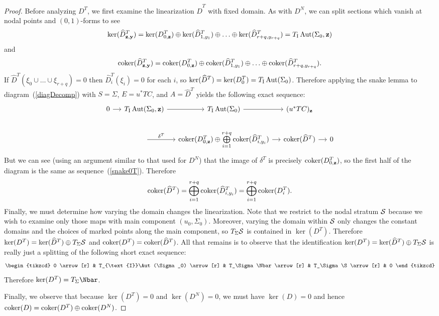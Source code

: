 \begin{proposition}
\begin{proof}
Before analyzing $D^T$, we first examine the linearization $\hat{D}^T$ with fixed domain. As with $D^N$, we can split sections which vanish at nodal points and $(0,1)$-forms to see
\[
\ker(\hat{D}_{\bf{z},\bf{y}}^T) = \ker(D_{0,\bf{z}}^T) \oplus \ker(\hat{D}_{1,y_1}^T) \oplus \ldots \oplus \ker(\hat{D}_{r+q,y_{r+q}}^T) = T_{\text{I}}\Aut(\Sigma_0,\bf{z})
\]
and
\[
\coker(\hat{D}_{\bf{z},\bf{y}}^T) = \coker(D_{0,\bf{z}}^T) \oplus \coker(\hat{D}_{1,y_1}^T) \oplus \ldots \oplus \coker(\hat{D}_{r+q,y_{r+q}}^T).
\]
If $\hat{D}^T(\xi_0 \cup\ldots\cup \xi_{r+q})=0$ then $\hat{D}_i^T(\xi_i)=0$ for each $i$, so $\ker(\hat{D}^T)=\ker(D_0^T)=T_{\text{I}}\Aut(\Sigma_0)$. Therefore applying the snake lemma to diagram~(\ref{diagDecomp}) with $S=\Sigma$, $E=u^*TC$, and $A=\hat{D}^T$ yields the following exact sequence:
\begin{equation}
\begin{tikzcd}[column sep=small]
0 \arrow[r] & T_{\text{I}}\Aut(\Sigma_0,\bf{z}) \arrow[r] & T_{\text{I}}\Aut(\Sigma_0) \arrow[r] & (u^*TC)_{\bf{z}}
\\
& \arrow[r, "\delta^T"] & \coker(D_{0,\bf{z}}^T) \oplus \bigoplus\limits_{i=1}^{r+q} \coker(\hat{D}_{i,y_i}^T) \arrow[r] & \coker(\hat{D}^T) \arrow[r] & 0
\end{tikzcd}
\label{snakeT}
\end{equation}
But we can see (using an argument similar to that used for $D^N$) that the image of $\delta^T$ is precisely $\coker(D_{0,\bf{z}}^T)$, so the first half of the diagram is the same as sequence~(\ref{snake0T}). Therefore 
\[
\coker(\hat{D}^T) = \bigoplus\limits_{i=1}^{r+q} \coker(\hat{D}_{i,y_i}^T) = \bigoplus\limits_{i=1}^{r+q} \coker(D_i^T).
\]
Finally, we must determine how varying the domain changes the linearization. Note that we restrict to the nodal stratum $\S$ because we wish to examine only those maps with main component $(u_0,\Sigma_0)$. Moreover, varying the domain within $\S$ only changes the constant domains and the choices of marked points along the main component, so $T_\Sigma\S$ is contained in $\ker(D^T)$. Therefore $\ker(D^T)=\ker(\hat{D}^T) \oplus T_\Sigma\S$ and  $\coker(D^T)=\coker(\hat{D}^T)$. All that remains is to observe that the identification $\ker(D^T)=\ker(\hat{D}^T) \oplus T_\Sigma\S$ is really just a splitting of the following short exact sequence:
\[
\begin{tikzcd}
0 \arrow[r] & T_{\text{I}}\Aut(\Sigma_0) \arrow[r] & T_\Sigma\Nbar \arrow[r] & T_\Sigma\S \arrow[r] & 0
\end{tikzcd}
\]
Therefore $\ker(D^T)=T_\Sigma\Nbar$.

Finally, we observe that because $\ker(D^T)=0$ and $\ker(D^N)=0$, we must have $\ker(D)=0$ and hence $\coker(D)=\coker(D^T) \oplus \coker(D^N)$.
\end{proof}
\end{proposition}
